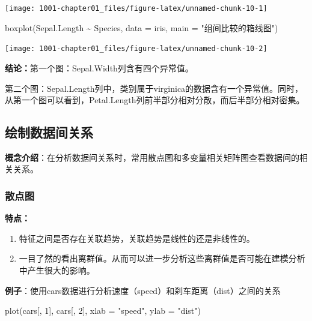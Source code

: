 \documentclass[
]{book}
\newenvironment{Shaded}{\begin{snugshade}}{\end{snugshade}}
\newcommand{\AttributeTok}[1]{\textcolor[rgb]{0.77,0.63,0.00}{#1}}
\newcommand{\DecValTok}[1]{\textcolor[rgb]{0.00,0.00,0.81}{#1}}
\newcommand{\FunctionTok}[1]{\textcolor[rgb]{0.00,0.00,0.00}{#1}}
\newcommand{\NormalTok}[1]{#1}
\newcommand{\SpecialCharTok}[1]{\textcolor[rgb]{0.00,0.00,0.00}{#1}}
\newcommand{\StringTok}[1]{\textcolor[rgb]{0.31,0.60,0.02}{#1}}
\begin{document}
\begin{center}\texttt{[image: 1001-chapter01\_files/figure-latex/unnamed-chunk-10-1]} \end{center}

\begin{Shaded}
\begin{Highlighting}[]
\FunctionTok{boxplot}\NormalTok{(Sepal.Length }\SpecialCharTok{\textasciitilde{}}\NormalTok{ Species, }\AttributeTok{data =}\NormalTok{ iris, }\AttributeTok{main =} \StringTok{"组间比较的箱线图"}\NormalTok{)}
\end{Highlighting}
\end{Shaded}

\begin{center}\texttt{[image: 1001-chapter01\_files/figure-latex/unnamed-chunk-10-2]} \end{center}

\textbf{结论：}第一个图：Sepal.Width列含有四个异常值。

第二个图：Sepal.Length列中，类别属于virginica的数据含有一个异常值。同时，从第一个图可以看到，Petal.Length列前半部分相对分散，而后半部分相对密集。

\hypertarget{ux7ed8ux5236ux6570ux636eux95f4ux5173ux7cfb}{%
\subsection{绘制数据间关系}\label{ux7ed8ux5236ux6570ux636eux95f4ux5173ux7cfb}}

\textbf{概念介绍}：在分析数据间关系时，常用散点图和多变量相关矩阵图查看数据间的相关关系。

\hypertarget{ux6563ux70b9ux56fe}{%
\subsubsection{散点图}\label{ux6563ux70b9ux56fe}}

\textbf{特点：}

\begin{enumerate}
\def\labelenumi{(\arabic{enumi})}
\item
  特征之间是否存在关联趋势，关联趋势是线性的还是非线性的。
\item
  一目了然的看出离群值。从而可以进一步分析这些离群值是否可能在建模分析中产生很大的影响。
\end{enumerate}

\textbf{例子}：使用cars数据进行分析速度（speed）和刹车距离（dist）之间的关系

\begin{Shaded}
\begin{Highlighting}[]
\FunctionTok{plot}\NormalTok{(cars[, }\DecValTok{1}\NormalTok{], cars[, }\DecValTok{2}\NormalTok{], }\AttributeTok{xlab =} \StringTok{"speed"}\NormalTok{, }\AttributeTok{ylab =} \StringTok{"dist"}\NormalTok{)}
\end{Highlighting}
\end{Shaded}
\end{document}
